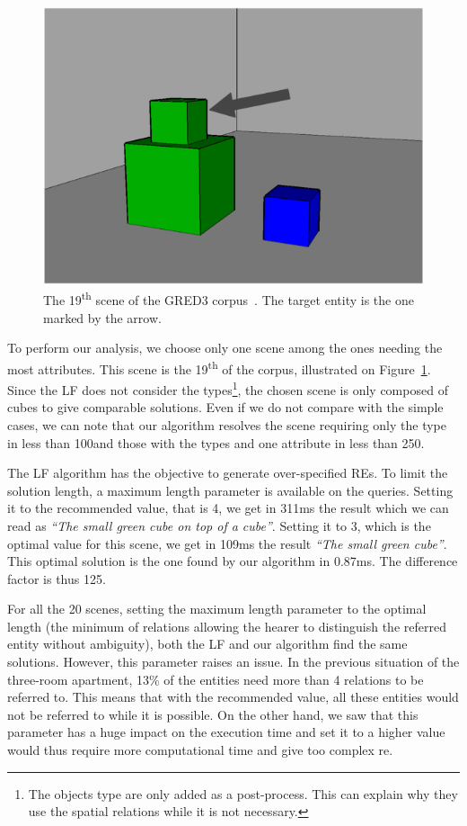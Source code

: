 \begin{figure}[ht!]
\centering
\includegraphics[scale=0.3]{figures/chapter4/GRED3.jpg}
\caption{\label{fig:chap4_gred3} The 19\textsuperscript{th} scene of the GRED3 corpus~\cite{dale_2009_referring}. The target entity is the one marked by the arrow.}
\end{figure}

To perform our analysis, we choose only one scene among the ones needing the most attributes. This scene is the 19\textsuperscript{th} of the corpus, illustrated on Figure~\ref{fig:chap4_gred3}. Since the LF does not consider the types\footnote{The objects type are only added as a post-process. This can explain why they use the spatial relations while it is not necessary.}, the chosen scene is only composed of cubes to give comparable solutions. Even if we do not compare with the simple cases, we can note that our algorithm resolves the scene requiring only the type in less than 100\us and those with the types and one attribute in less than 250\us.

The LF algorithm has the objective to generate over-specified REs. To limit the solution length, a maximum length parameter is available on the queries. Setting it to the recommended value, that is 4, we get in 311ms the result which we can read as \textit{``The small green cube on top of a cube''}. Setting it to 3, which is the optimal value for this scene, we get in 109ms the result \textit{``The small green cube''}. This optimal solution is the one found by our algorithm in 0.87ms. The difference factor is thus 125.

For all the 20 scenes, setting the maximum length parameter to the optimal length (the minimum of relations allowing the hearer to distinguish the referred entity without ambiguity), both the LF and our algorithm find the same solutions. However, this parameter raises an issue. In the previous situation of the three-room apartment, 13\% of the entities need more than 4 relations to be referred to. This means that with the recommended value, all these entities would not be referred to while it is possible. On the other hand, we saw that this parameter has a huge impact on the execution time and set it to a higher value would thus require more computational time and give too complex \acrshort{re}.

